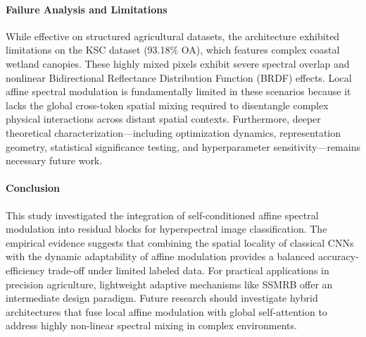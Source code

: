 \documentclass[pdflatex,sn-mathphys-num]{sn-jnl}
\theoremstyle{thmstyleone}
\theoremstyle{thmstyletwo}
\theoremstyle{thmstylethree}
\begin{document}
\paragraph{Failure Analysis and Limitations}
While effective on structured agricultural datasets, the architecture exhibited limitations on the KSC dataset (93.18\% OA), which features complex coastal wetland canopies. These highly mixed pixels exhibit severe spectral overlap and nonlinear Bidirectional Reflectance Distribution Function (BRDF) effects. Local affine spectral modulation is fundamentally limited in these scenarios because it lacks the global cross-token spatial mixing required to disentangle complex physical interactions across distant spatial contexts. Furthermore, deeper theoretical characterization---including optimization dynamics, representation geometry, statistical significance testing, and hyperparameter sensitivity---remains necessary future work.

\paragraph{Conclusion}
This study investigated the integration of self-conditioned affine spectral modulation into residual blocks for hyperspectral image classification. The empirical evidence suggests that combining the spatial locality of classical CNNs with the dynamic adaptability of affine modulation provides a balanced accuracy-efficiency trade-off under limited labeled data. For practical applications in precision agriculture, lightweight adaptive mechanisms like SSMRB offer an intermediate design paradigm. Future research should investigate hybrid architectures that fuse local affine modulation with global self-attention to address highly non-linear spectral mixing in complex environments.
\end{document}
